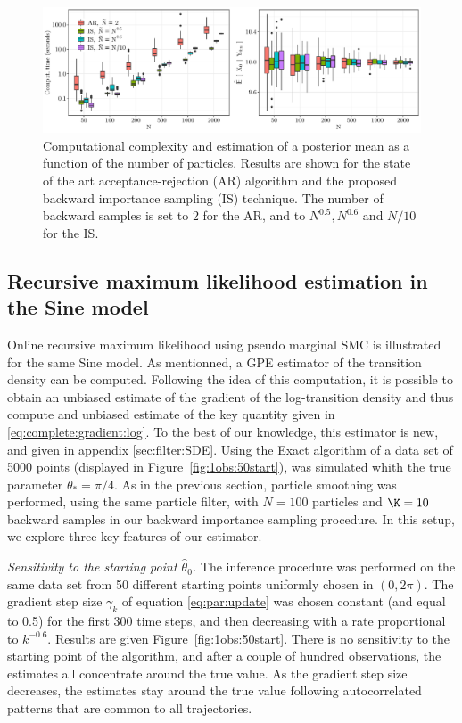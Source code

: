 \documentclass[12pt]{article}
\newcommand{\parvec}{\theta}
\newcommand{\N}{N}
\begin{document}
\begin{figure}[h]
\begin{center}
\includegraphics[width = \textwidth]{Figure3.pdf}
\end{center}
\caption{Computational complexity and estimation of a posterior mean as a function of the number of particles. Results are shown for the state of the art acceptance-rejection (AR) algorithm and the proposed backward  importance sampling (IS) technique. The number of backward samples is set to 2 for the AR, and to $N^{0.5}, N^{0.6}$ and $N/10$ for the IS.}
\label{fig:sine:timeandbias:N:vary}
\end{figure}


\subsection{Recursive maximum likelihood estimation in the  Sine model}
\label{sec:simu:tangent:filter}
Online recursive maximum likelihood using pseudo marginal SMC is illustrated for the same Sine model.
As mentionned, a GPE estimator of the transition density can be computed. 
Following the idea of this computation, it is possible to obtain an unbiased estimate of the gradient of the log-transition density and thus compute and unbiased estimate of the key quantity given in \eqref{eq:complete:gradient:log}. 
To the best of our knowledge, this estimator is new, and given in appendix \ref{sec:filter:SDE}.
Using the Exact algorithm of \cite{beskos2006retrospective} a data set of 5000 points (displayed in Figure~\ref{fig:1obs:50start}), was simulated whith the true parameter $\parvec_* = \pi/4$. 
As in the previous section, particle smoothing was performed, using  the same particle filter, with $\N = 100$ particles and $\K = 10$ backward samples in our backward importance sampling procedure. 
In this setup, we explore three key features of our estimator.

{\em Sensitivity to the starting point $\hat{\parvec}_0$.}
The inference procedure was performed on the same data set from 50 different starting points uniformly chosen in $(0,2\pi)$. 
The gradient step size $\gamma_k$ of equation \eqref{eq:par:update} was chosen constant (and equal to 0.5) for the first 300 time steps, and then decreasing with a rate proportional to $k^{-0.6}$. 
Results are given Figure~\ref{fig:1obs:50start}. There is no sensitivity to the starting point of the algorithm, and after a couple of hundred observations, the estimates all concentrate around the true value. 
As the gradient step size decreases, the estimates stay around the true value following autocorrelated patterns that are common to all trajectories.
\end{document}
